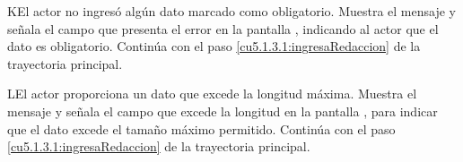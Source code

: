  \begin{UCtrayectoriaA}{K}{El actor no ingresó algún dato marcado como obligatorio.}
    \UCpaso[\UCsist] Muestra el mensaje  y señala el campo que presenta el error en la pantalla , indicando al actor que el dato es obligatorio.
    \UCpaso[] Continúa con el paso \ref{cu5.1.3.1:ingresaRedaccion} de la trayectoria principal.
 \end{UCtrayectoriaA}
 
 \begin{UCtrayectoriaA}{L}{El actor proporciona un dato que excede la longitud máxima.}
    \UCpaso[\UCsist] Muestra el mensaje  y señala el campo que excede la 
    longitud en la pantalla , para indicar que el dato excede el tamaño máximo permitido.
    \UCpaso[] Continúa con el paso \ref{cu5.1.3.1:ingresaRedaccion} de la trayectoria principal.
 \end{UCtrayectoriaA}

  